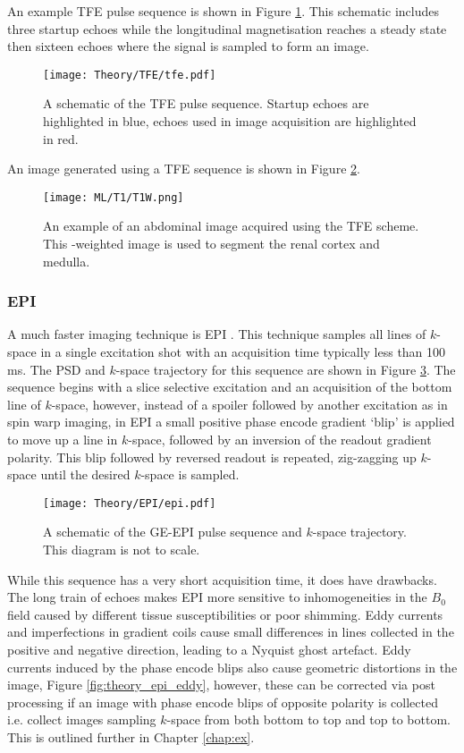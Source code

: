 An example \ac{TFE} pulse sequence is shown in Figure \ref{fig:theory_tfe_psd}. This schematic includes three startup echoes while the longitudinal magnetisation reaches a steady state then sixteen echoes where the signal is sampled to form an image.
\begin{figure}[H]
	\centering
	\texttt{[image: Theory/TFE/tfe.pdf]}
	\caption{A schematic of the \ac{TFE} pulse sequence. Startup echoes are highlighted in blue, echoes used in image acquisition are highlighted in red.}
	\label{fig:theory_tfe_psd}
\end{figure}
An image generated using a \ac{TFE} sequence is shown in Figure \ref{fig:theory_tfe_example}.
\begin{figure}[H]
	\centering
	\texttt{[image: ML/T1/T1W.png]}
	\caption{An example of an abdominal image acquired using the \ac{TFE} scheme. This \tone-weighted image is used to segment the renal cortex and medulla.}
	\label{fig:theory_tfe_example}	
\end{figure}

\subsubsection{\ac*{EPI}}
A much faster imaging technique is \ac{EPI} \cite{mansfield_nmr_1973}. This technique samples all lines of $k$-space in a single excitation shot with an acquisition time typically less than 100 ms. The \ac{PSD} and $k$-space trajectory for this sequence are shown in Figure \ref{fig:theory_epi}. The sequence begins with a slice selective excitation and an acquisition of the bottom line of $k$-space, however, instead of a spoiler followed by another excitation as in spin warp imaging, in \ac{EPI} a small positive phase encode gradient `blip' is applied to move up a line in $k$-space, followed by an inversion of the readout gradient polarity. This blip followed by reversed readout is repeated, zig-zagging up $k$-space until the desired $k$-space is sampled.

\begin{figure}[H]
	\centering
	\texttt{[image: Theory/EPI/epi.pdf]}
	\caption{A schematic of the \ac{GE}-\ac{EPI} pulse sequence and $k$-space trajectory. This diagram is not to scale.}
	\label{fig:theory_epi}	
\end{figure}

While this sequence has a very short acquisition time, it does have drawbacks. The long train of echoes makes \ac{EPI} more sensitive to inhomogeneities in the $B_0$ field caused by different tissue susceptibilities or poor shimming. Eddy currents and imperfections in gradient coils cause small differences in lines collected in the positive and negative direction, leading to a Nyquist ghost artefact. Eddy currents induced by the phase encode blips also cause geometric distortions in the image, Figure \ref{fig:theory_epi_eddy}, however, these can be corrected via post processing if an image with phase encode blips of opposite polarity is collected i.e. collect images sampling $k$-space from both bottom to top and top to bottom. This is outlined further in Chapter \ref{chap:ex}.

